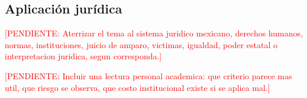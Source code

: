 \documentclass[
	spanish,
	letterpaper, oneside
]{article}
\newcommand{\pendiente}[1]{\textcolor{red}{[PENDIENTE: #1]}}
\begin{document}
\subsection{Aplicación jurídica}

\pendiente{Aterrizar el tema al sistema juridico mexicano, derechos humanos, normas, instituciones, juicio de amparo, victimas, igualdad, poder estatal o interpretacion juridica, segun corresponda.}

\pendiente{Incluir una lectura personal academica: que criterio parece mas util, que riesgo se observa, que costo institucional existe si se aplica mal.}

%
%
%
%
%
\end{document}
